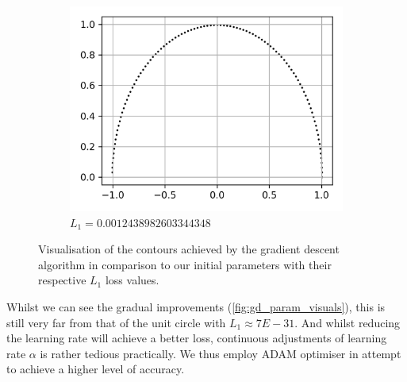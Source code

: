 \documentclass[a4paper]{report}
\begin{document}
\begin{figure}[H]
\begin{subfigure}{.33\linewidth}
      \includegraphics[width=\linewidth]{images/gd/params_after_GD.png}
      \caption{$L_1 = 0.0012438982603344348$}
      \label{fig:gd_final}
    \end{subfigure}
    
    \caption{Visualisation of the contours achieved by the gradient descent algorithm in comparison to our initial parameters with their respective $L_1$ loss values. }
    \label{fig:gd_param_visuals}
\end{figure}

Whilst we can see the gradual improvements (\autoref{fig:gd_param_visuals}), this is still very far from that of the unit circle with $L_1 \approx 7E-31$. And whilst reducing the learning rate will achieve a better loss, continuous adjustments of learning rate $\alpha$ is rather tedious practically. We thus employ ADAM optimiser in attempt to achieve a higher level of accuracy.

\end{document}
